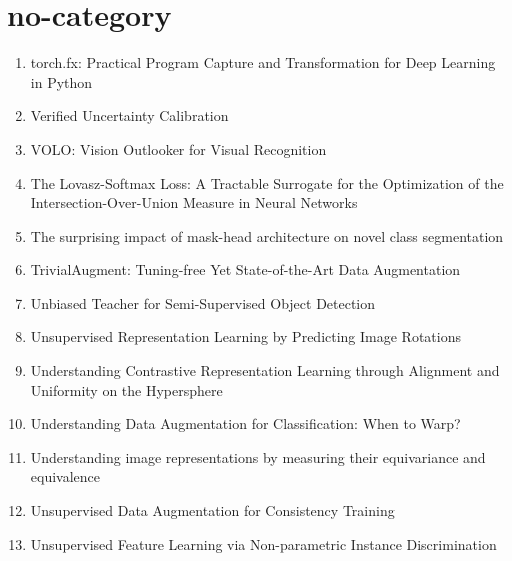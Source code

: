 \documentclass[acmlarge]{acmart}
\begin{document}
\section{no-category}
\begin{enumerate}
	\item torch.fx: Practical Program Capture and Transformation for Deep Learning in Python \cite{Reed2021torchfxPP} 

	\item Verified Uncertainty Calibration \cite{Kumar2019VerifiedUC} 

	\item VOLO: Vision Outlooker for Visual Recognition \cite{Yuan2021VOLOVO} 

	\item The Lovasz-Softmax Loss: A Tractable Surrogate for the Optimization of the Intersection-Over-Union Measure in Neural Networks \cite{Berman2018TheLL} 

	\item The surprising impact of mask-head architecture on novel class segmentation \cite{Birodkar2021TheSI} 

	\item TrivialAugment: Tuning-free Yet State-of-the-Art Data Augmentation \cite{Mller2021TrivialAugmentTY} 

	\item Unbiased Teacher for Semi-Supervised Object Detection \cite{Liu2021UnbiasedTF} 

	\item Unsupervised Representation Learning by Predicting Image Rotations \cite{Gidaris2018UnsupervisedRL} 

	\item Understanding Contrastive Representation Learning through Alignment and Uniformity on the Hypersphere \cite{Wang2020UnderstandingCR} 

	\item Understanding Data Augmentation for Classification: When to Warp? \cite{Wong2016UnderstandingDA} 

	\item Understanding image representations by measuring their equivariance and equivalence \cite{Lenc2015UnderstandingIR} 

	\item Unsupervised Data Augmentation for Consistency Training \cite{Xie2020UnsupervisedDA} 

	\item Unsupervised Feature Learning via Non-parametric Instance Discrimination \cite{Wu2018UnsupervisedFL} 


\end{enumerate}
\end{document}
